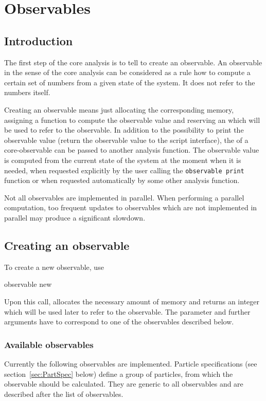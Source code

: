 \section{Observables}


\subsection{Introduction}
The first step of the core analysis is to tell \es to create an observable.
An observable in the sense of the core analysis can be considered as 
a rule how to compute a certain set of numbers from a given state of the system.
It does not refer to the numbers itself.

Creating an observable means just allocating the corresponding memory, assigning a function 
to compute the observable value and reserving an  which will be used to refer 
to the observable. 
In addition to the possibility to  print the observable value 
(return the observable value to the script interface), 
the  of a core-observable can be passed to another analysis function. 
The observable value is computed from the current state of the system
at the moment when it is needed, \ie when requested explicitly by the 
user calling the \verb!observable print! function or when requested
automatically by some other analysis function.

Not all observables are implemented in parallel. When performing a parallel
computation, too frequent updates to observables which are not implemented
in parallel may produce a significant slowdown.

\subsection{Creating an observable}
To create a new observable, use
\begin{essyntax}
  observable new  
\end{essyntax}
  
Upon this call, \es allocates the necessary amount of memory and returns 
an integer  which will be used later to refer to the observable. 
The parameter  and further arguments have to correspond to one of the
observables described below.

\subsubsection{Available observables}
Currently the following observables are implemented.
Particle specifications (see section~\ref{sec:PartSpec} below)
define a group of particles, from which the observable should be calculated. 
They are generic to all observables and are described after the list of observables.

